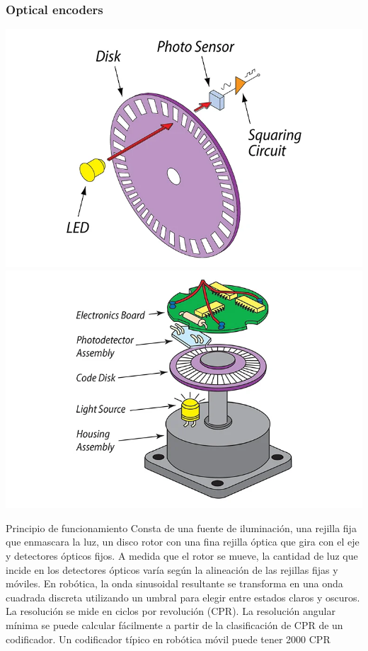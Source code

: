 \begin{frame}
    \frametitle{Optical encoders}

    \includegraphics[width=0.4\columnwidth]{images/encoder_principle}
    \includegraphics[width=0.4\columnwidth]{images/encoder_parts}
    \footnotesize

\begin{block}{Principio de funcionamiento}
    Consta de una fuente de iluminación, una rejilla fija que enmascara la luz, un disco rotor con una fina rejilla óptica que gira con el eje y detectores ópticos fijos. A medida que el rotor se mueve, la cantidad de luz que incide en los detectores ópticos varía según la alineación de las rejillas fijas y móviles. En robótica, la onda sinusoidal resultante se transforma en una onda cuadrada discreta utilizando un umbral para elegir entre estados claros y oscuros. La resolución se mide en ciclos por revolución (CPR). La resolución angular mínima se puede calcular fácilmente a partir de la clasificación de CPR de un codificador. Un codificador típico en robótica móvil puede tener 2000 CPR
\end{block}
\end{frame}

